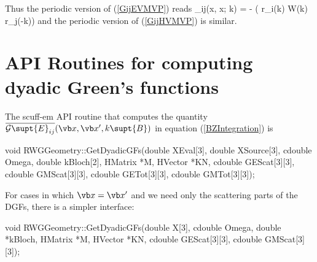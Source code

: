 \documentclass[letterpaper]{article}
\newcommand{\iD}{_{i\text{\tiny D}}}
\newcommand{\jS}{_{j\text{\tiny S}}}
\begin{document}
Thus the periodic version of (\ref{GijEVMVP}) reads
{
 _{ij}(\vb x, \vb x; \vb k)
= -
   \Big( \vb r\iD{}(\vb k) 
              \cdot \vb W(\vb k) 
   \cdot \vb r\jS{}(-\vb k)\Big)
}
and the periodic version of (\ref{GijHVMVP}) is similar.

\newpage
\section{API Routines for computing dyadic Green's functions}

The {\sc scuff-em} API routine that computes the quantity
$\overline{\mathcal{G}\supt{E}_{ij}}(\vb x, \vb x^\prime, k\supt{B})$
in equation (\ref{BZIntegration}) is 

\smallskip 
\begin{center}
\begin{verbcode}
void RWGGeometry::GetDyadicGFs(double XEval[3], double XSource[3],
                               cdouble Omega, double kBloch[2],
                               HMatrix *M, HVector *KN,
                               cdouble GEScat[3][3],
                               cdouble GMScat[3][3],
                               cdouble GETot[3][3],
                               cdouble GMTot[3][3]);
\end{verbcode}
\end{center}
\smallskip

For cases in which $\vb x=\vb x^\prime$ and we need only the 
scattering parts of the DGFs, there is a simpler interface:

\smallskip 
\begin{center}
\begin{verbcode}
void RWGGeometry::GetDyadicGFs(double X[3], cdouble Omega, 
                               double *kBloch,
                               HMatrix *M, HVector *KN,
                               cdouble GEScat[3][3], 
                               cdouble GMScat[3][3]);
\end{verbcode}
\end{center}
\smallskip 
\end{document}
